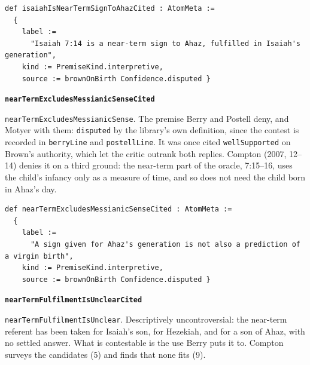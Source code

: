 \documentclass[11pt]{article}
\begin{document}
{\small\begin{verbatim}
def isaiahIsNearTermSignToAhazCited : AtomMeta :=
  {
    label :=
      "Isaiah 7:14 is a near-term sign to Ahaz, fulfilled in Isaiah's generation",
    kind := PremiseKind.interpretive,
    source := brownOnBirth Confidence.disputed }
\end{verbatim}}
\par\medskip\noindent\textbf{\texttt{near\allowbreak{}Term\allowbreak{}Excludes\allowbreak{}Messianic\allowbreak{}Sense\allowbreak{}Cited}}\par\nobreak\noindent
\texttt{near\allowbreak{}Term\allowbreak{}Excludes\allowbreak{}Messianic\allowbreak{}Sense}. The premise Berry and Postell deny, and Motyer with them: \texttt{disputed} by the library’s own definition, since the contest is recorded in \texttt{berry\allowbreak{}Line} and \texttt{postell\allowbreak{}Line}. It was once cited \texttt{well\allowbreak{}Supported} on Brown’s authority, which let the critic outrank both replies. Compton (2007, 12–14) denies it on a third ground: the near-term part of the oracle, 7:15–16, uses the child’s infancy only as a measure of time, and so does not need the child born in Ahaz’s day.

{\small\begin{verbatim}
def nearTermExcludesMessianicSenseCited : AtomMeta :=
  {
    label :=
      "A sign given for Ahaz's generation is not also a prediction of a virgin birth",
    kind := PremiseKind.interpretive,
    source := brownOnBirth Confidence.disputed }
\end{verbatim}}
\par\medskip\noindent\textbf{\texttt{near\allowbreak{}Term\allowbreak{}Fulfilment\allowbreak{}Is\allowbreak{}Unclear\allowbreak{}Cited}}\par\nobreak\noindent
\texttt{near\allowbreak{}Term\allowbreak{}Fulfilment\allowbreak{}Is\allowbreak{}Unclear}. Descriptively uncontroversial: the near-term referent has been taken for Isaiah’s son, for Hezekiah, and for a son of Ahaz, with no settled answer. What is contestable is the use Berry puts it to. Compton surveys the candidates (5) and finds that none fits (9).
\end{document}
